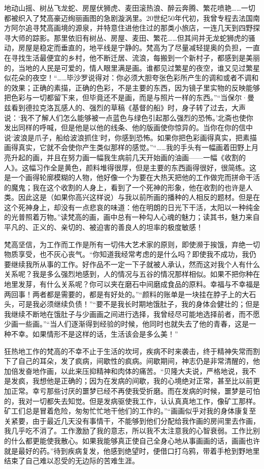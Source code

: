 \documentclass{article}
\begin{document}
地动山摇、树丛飞龙蛇、房屋伏狮虎、麦田滚热浪、醉云奔腾、繁花喷艳……一切都被织入了梵高豪迈绚丽画图的急剧漩涡里。20世纪50年代初，我曾专程去法国南方阿尔追寻梵高画境的源泉，并特意住进他住过的那类小旅店，一连几天到四野探寻大师的踪影。那里依旧有树丛、房屋、麦田、繁花……但其间并无龙蛇狮虎的骚动，房屋是稳定而垂直的，地平线是宁静的。梵高为了尽量减轻提奥的负担，一直在寻找生活最便宜的乡村，他不断迁居、流浪，每搬到一个新村子，都感到是美丽的，当地的人民是可爱的，情人眼里满是画。谁都见过繁星的夜空，谁又见过繁星似花朵的夜空！“……毕沙罗说得对：你必须大胆夸张色彩所产生的调和或者不调和的效果；正确的素描，正确的色彩，不是主要的东西，因为镜子里实物的反映能够把色彩与一切都留下来，但毕竟还不是画，而是与照片一样的东西。”“当保尔·曼兹看到德拉克洛瓦感人的、强烈的草稿《基督的船》时，身子转了过去，大声说：‘我不了解人们怎么能够被一点蓝色与绿色引起那么强烈的恐怖。’北斋也使你发出同样的呼喊，但是他是以他的线条、他的版画使你惊异的。当你在你的信中说‘波浪是爪子，船给波浪抓住’时，你感到恐怖。如果你把色彩画得真实，把素描画得真实，它就不会使你产生类似那样的感觉。”“……我的手头有一幅画着田野上月亮升起的画，并且在努力画一幅我生病前几天开始画的油画——一幅《收割的人》。这幅习作全是黄色，颜料堆得很厚，但是主要的东西画得很好，很简练。这是一个画得轮廓模糊的人物，他好像一个为要在大热天把他的工作做完而拼命干活的魔鬼；我在这个收割的人身上，看到了一个死神的形象，他在收割的也许是人类。因此这是（如果你高兴这样说）与我以前所画的播种的人相反的题材。但是在这个死神身上，却没有一点悲哀的味道：他在明朗的日光下干活，太阳以一种纯金的光普照着万物。”读梵高的画，画中总有一种勾人心魂的魅力；读其书，魅力来自平凡的、正义的、亲切的、被迫害的善良人的坦率的极度敏感！

梵高坚信，为工作而工作是所有一切伟大艺术家的原则，即使濒于挨饿，弃绝一切物质享受，也不灰心丧气。“你知道我经常考虑的是什么吗？即使我不成功，我仍要继续我所从事的工作。好作品不一定一下子就被人承认，然而这对我个人有什么关系呢？我是多么强烈地感到，人的情况与五谷的情况那样相似。如果不把你种在地里发芽，有什么关系呢？你可以夹在磨石中间磨成食品的原料。幸福与不幸福是两回事！两者都是需要的，都是有好处的。”“颜料的账单是一块挂在脖子上的大石头，可是我必须继续负债！”“要不是我长时期地饿肚子，我的身体会健壮的；但是我继续不断地在饿肚子与少画画之间进行选择，我曾经尽可能地选择前者，而不愿少画一些画。”“当人们逐渐得到经验的时候，他同时也就失去了他的青春，这是一种不幸。如果情形不是这样的话，生活该会是多么美！”

狂热地工作的梵高的不幸不止于生活的坎坷，疾病不时来袭击，终于精神失常而割下了自己的耳朵，发了疯病，间歇性的疯病。间歇期间，神志仍是非常清醒的，他加倍发奋地作画，以此来压抑精神和肉体的痛苦。“贝隆大夫说，严格地说，我不是发疯，我想他是正确的；因为在发病的间歇，我的心境绝对正常，甚至比以前更加正常。幸亏那些讨厌的噩梦已经不再使我受折磨。而在发病的时候，噩梦是可怕的，我对一切都失去知觉。但是发病驱使我工作，认认真真地工作，像矿工那样。矿工们总是冒着危险，匆匆忙忙地干他们的工作的。”“画画似乎对我的身体康复至关紧要，由于最近几天没有事情干，不能够到他们分配给我作画的房间里去作画，我几乎吃不消了。工作激励了我的意志，所以我不太注意我的心智衰弱。工作比别的什么都更能使我散心。如果我能够真正使自己全身心地从事画画的话，画画也许就是最好的药。”待到疾病复发，他感到绝望时，便借口打乌鸦，带着手枪到野地里结束了自己难以忍受的无边际的苦难生涯。
\end{document}
